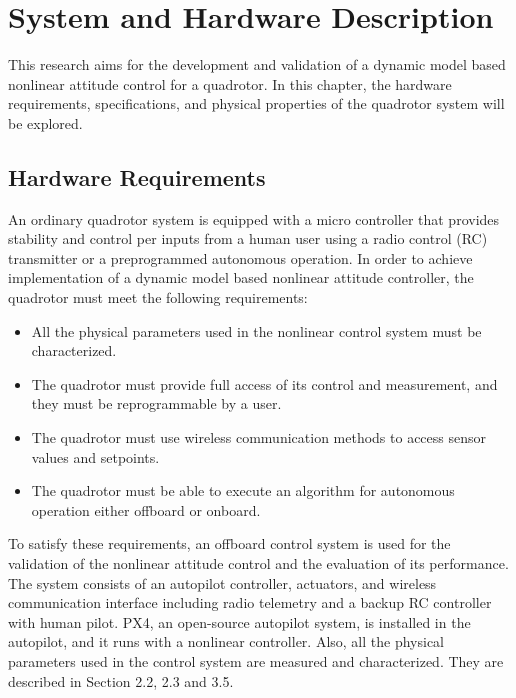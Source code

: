 \chapter{System and Hardware Description}
\label{ch:system}
This research aims for the development and validation of a dynamic model based nonlinear attitude control for a quadrotor. In this chapter, the hardware requirements, specifications, and physical properties of the quadrotor system will be explored.

\section{Hardware Requirements}
An ordinary quadrotor system is equipped with a micro controller that provides stability and control per inputs from a human user using a radio control (RC) transmitter or a preprogrammed autonomous operation. In order to achieve implementation of a dynamic model based nonlinear attitude controller, the quadrotor must meet the following requirements:
\begin{itemize}
\item All the physical parameters used in the nonlinear control system must be characterized.
\item The quadrotor must provide full access of its control and measurement, and they must be reprogrammable by a user. 
\item The quadrotor must use wireless communication methods to access sensor values and setpoints.
\item The quadrotor must be able to execute an algorithm for autonomous operation either offboard or onboard.
\end{itemize}
To satisfy these requirements, an offboard control system is used for the validation of the nonlinear attitude control and the evaluation of its performance. The system consists of an autopilot controller, actuators, and wireless communication interface including radio telemetry and a backup RC controller with human pilot. PX4, an open-source autopilot system, is installed in the autopilot, and it runs with a nonlinear controller. Also, all the physical parameters used in the control system are measured and characterized. They are described in Section 2.2, 2.3 and 3.5.

